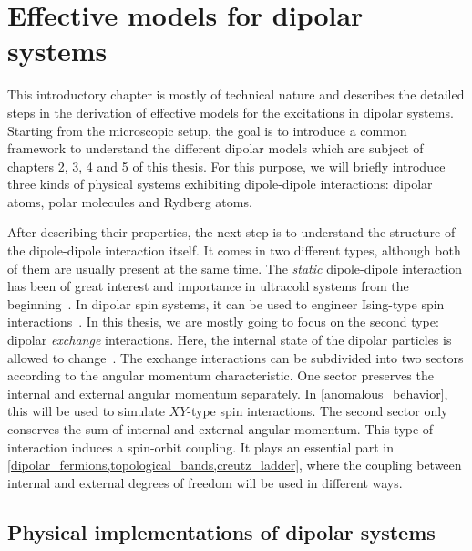 \chapter{Effective models for dipolar systems}
\label{dipolar_spinmodels}

This introductory chapter is mostly of technical nature and describes the detailed steps in the derivation of effective models for the excitations in dipolar systems.
Starting from the microscopic setup, the goal is to
introduce a common framework to understand the different dipolar models which are subject of
chapters 2, 3, 4 and 5 of this thesis. For this purpose,
we will briefly introduce three kinds of physical systems exhibiting dipole-dipole interactions: dipolar atoms, polar molecules and Rydberg atoms.

After describing their properties, the next step is to understand the structure of the dipole-dipole interaction itself.
It comes in two different types, although both of them are usually present at the same time.
The \emph{static} dipole-dipole interaction has been of great interest and importance in ultracold systems from the beginning~\cite{Goral1999,Santos2000a,Santos2003a,Griesmaier2005a,Stuhler2005,Ronen2007a,Koch2008a,Lahaye2008a,Lahaye2009}.
In dipolar spin systems, it can be used to engineer Ising-type spin interactions~\cite{Micheli2006,Hauke2010,Gorshkov2011,Gorshkov2011b,Peter2012b,Syzranov2014,Peter2014}.
In this thesis, we are mostly going to focus on the second type: dipolar \emph{exchange} interactions.
Here, the internal state of the dipolar particles is allowed to change~\cite{Huber2011,Yan2013,DePaz2013,Hazzard2014,Barredo2014,Syzranov2014}.
The exchange interactions can be subdivided into two sectors according to the angular momentum characteristic.
One sector preserves the internal and external angular momentum separately.
In \cref{anomalous_behavior}, this will be used to simulate $XY$-type spin interactions.
The second sector only conserves the sum of internal and external angular momentum.
This type of interaction induces a spin-orbit coupling. It plays an essential part in \cref{dipolar_fermions,topological_bands,creutz_ladder}, where the coupling between internal and external degrees of freedom will be used in different ways.

\section{Physical implementations of dipolar systems}

